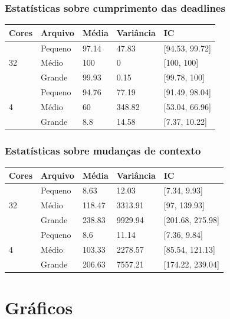 \documentclass{beamer}
\begin{document}
\begin{frame}
\frametitle{Estatísticas sobre cumprimento das deadlines}
\begin{table}
\begin{tabular}{l l l l l}
\toprule
\textbf{Cores} & \textbf{Arquivo} & \textbf{Média} & \textbf{Variância} & \textbf{IC}\\
\midrule
\multirow{3}{*}{32} & Pequeno & 97.14 & 47.83  & [94.53, 99.72] \\
 					& Médio   & 100   & 0      & [100, 100] \\
 					& Grande  & 99.93 & 0.15   & [99.78, 100] \\
\midrule
\multirow{3}{*}{4}  & Pequeno & 94.76 & 77.19  & [91.49, 98.04] \\
 					& Médio   & 60    & 348.82 & [53.04, 66.96] \\
 					& Grande  & 8.8   & 14.58  & [7.37, 10.22] \\
\bottomrule
\end{tabular}
\end{table}
\end{frame}

\begin{frame}
\frametitle{Estatísticas sobre mudanças de contexto}
\begin{table}
\begin{tabular}{l l l l l}
\toprule
\textbf{Cores} & \textbf{Arquivo} & \textbf{Média} & \textbf{Variância} & \textbf{IC}\\
\midrule
\multirow{3}{*}{32} & Pequeno & 8.63   & 12.03   & [7.34, 9.93] \\
					& Médio   & 118.47 & 3313.91 & [97, 139.93] \\
					& Grande  & 238.83 & 9929.94 & [201.68, 275.98] \\
\midrule
\multirow{3}{*}{4}  & Pequeno & 8.6    & 11.14   & [7.36, 9.84] \\
					& Médio   & 103.33 & 2278.57 & [85.54, 121.13] \\
					& Grande  & 206.63 & 7557.21 & [174.22, 239.04] \\
\bottomrule
\end{tabular}
\end{table}
\end{frame}
\section{Gráficos}
\end{document}
